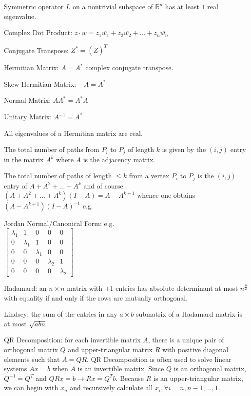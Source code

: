 Symmetric operator $L$ on a nontrivial subspace of $\mathbb{R}^n$ has at least $1$ real eigenvalue.

Complex Dot Product: $z \cdot w = z_1 \overline{w_1} + z_2 \overline{w_2} + \dots + z_n \overline{w_n}$

Conjugate Transpose: $Z^{*} = \left( \overline{Z} \right)^T$

Hermitian Matrix: $A=A^*$ complex conjugate transpose.

Skew-Hermitian Matrix: $-A=A^*$

Normal Matrix: $A A^* = A^* A$

Unitary Matrix: $A^{-1}=A^*$

All eigenvalues of a Hermitian matrix are real.

The total number of paths from $P_i$ to $P_j$ of length $k$ is given by the $(i,j)$ entry in the matrix $A^k$ where $A$ is the adjacency matrix.

The total number of paths of length $\le k$ from a vertex $P_i$ to $P_j$ is the $(i,j)$ entry of $A+A^2+\dots+A^k$ and of course $(A+A^2+\dots+A^k)(I-A)=A-A^{k+1}$ whence one obtains $(A-A^{k+1})(I-A)^{-1}$ e.g.

Jordan Normal/Canonical Form: e.g. \\ 
$\begin{bmatrix}
\lambda_1 & 1 & 0 & 0 & 0 \\
0 & \lambda_1 & 1 & 0 & 0 \\
0 & 0 & \lambda_1 & 0 & 0 \\
0 & 0 & 0 & \lambda_2 & 1 \\
0 & 0 & 0 & 0 & \lambda_2
\end{bmatrix}$

Hadamard: an $n \times n$ matrix with $\pm 1$ entries has absolute determinant at most $n^{\frac{n}{2}}$ with equality if and only if the rows are mutually orthogonal.

Lindsey: the sum of the entries in any $a \times b$ submatrix of a Hadamard matrix is at most $\sqrt{abn}$

QR Decomposition: for each invertible matrix $A$, there is a unique pair of orthogonal matrix $Q$ and upper-triangular matrix $R$ with positive diagonal elements such that $A=QR$. QR Decomposition is often used to solve linear systems $Ax=b$ when $A$ is an invertible matrix. Since $Q$ is an orthogonal matrix, $Q^{-1}=Q^T$ and $QRx=b \to Rx=Q^T b$. Because $R$ is an upper-triangular matrix, we can begin with $x_n$ and recursively calculate all $x_i, \forall i=n,n-1,\dots,1$.

